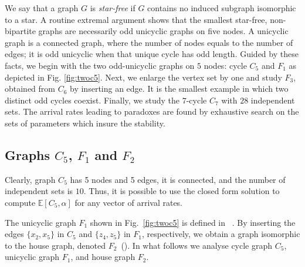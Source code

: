\documentclass{llncs}
\begin{document}
We say that a graph $G$ is \emph{star-free} if $G$ contains no induced subgraph isomorphic to a star.  
A routine extremal argument shows that the smallest star-free, non-bipartite graphs are necessarily odd unicyclic graphs on five nodes.
A unicyclic graph is a connected graph, where the number of nodes equals to the number of edges; it is odd unicyclic when that unique cycle has odd length.
Guided by these facts, we begin with the two odd-unicyclic graphs on $5$ nodes: cycle $C_{5}$ and $F_{1}$ as depicted in Fig. \ref{fig:twoc5}. Next, we enlarge the vertex set by one and study $F_{3}$, obtained from $C_{6}$ by inserting an edge. It is the smallest example in which two distinct odd cycles coexist. Finally, we study the $7$-cycle $C_{7}$ with $28$ independent sets. The arrival rates leading to paradoxes are found by exhaustive search on the sets of parameters which insure the stability. 


\subsection{Graphs $C_5$, $F_1$ and $F_2$}
Clearly, graph $C_5$ has 5 nodes and 5 edges, it is connected, and the number of independent sets is 
$10$. Thus, it is possible to use the closed form solution to compute $\mathbb{E} [C_5, \alpha]$ for any  vector of arrival rates.

The unicyclic graph $F_{1}$ shown in Fig.~\ref{fig:twoc5} is defined in ~\cite{west2001}.  
By inserting the edges $\{x_{2},x_{5}\}$ in $C_{5}$ and $\{z_{4},z_{5}\}$ in $F_{1}$, respectively, we obtain a graph isomorphic to the {house} graph, denoted $F_{2}$~(\cite[p.~12]{west2001}). In what follows we analyse cycle graph $C_{5}$,  
unicyclic graph $F_{1}$, and   house graph $F_{2}$.
\end{document}

